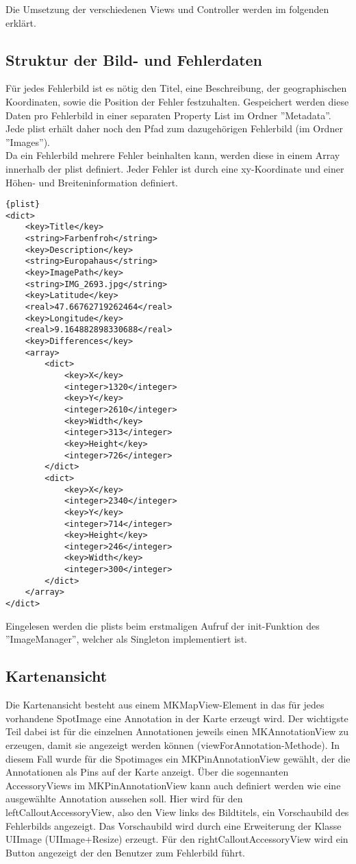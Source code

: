 Die Umsetzung der verschiedenen Views und Controller werden im folgenden erklärt.

\subsection{Struktur der Bild- und Fehlerdaten}
Für jedes Fehlerbild ist es nötig den Titel, eine Beschreibung, der geographischen Koordinaten, sowie die Position der Fehler festzuhalten. Gespeichert werden diese
Daten pro Fehlerbild in einer separaten Property List im Ordner ''Metadata''. Jede plist erhält daher noch den Pfad zum dazugehörigen Fehlerbild (im Ordner ''Images'').\\
Da ein Fehlerbild mehrere Fehler beinhalten kann, werden diese in einem Array innerhalb
der plist definiert. Jeder Fehler ist durch eine xy-Koordinate und einer Höhen- und Breiteninformation definiert.

\begin{lstlisting}[caption=Ausschnitt aus einer plist]{plist}
<dict>
	<key>Title</key>
	<string>Farbenfroh</string>
	<key>Description</key>
	<string>Europahaus</string>
	<key>ImagePath</key>
	<string>IMG_2693.jpg</string>
	<key>Latitude</key>
	<real>47.66762719262464</real>
	<key>Longitude</key>
	<real>9.164882898330688</real>
	<key>Differences</key>
	<array>
		<dict>
			<key>X</key>
			<integer>1320</integer>
			<key>Y</key>
			<integer>2610</integer>
			<key>Width</key>
			<integer>313</integer>
			<key>Height</key>
			<integer>726</integer>
		</dict>
		<dict>
			<key>X</key>
			<integer>2340</integer>
			<key>Y</key>
			<integer>714</integer>
			<key>Height</key>
			<integer>246</integer>
			<key>Width</key>
			<integer>300</integer>
		</dict>
	</array>
</dict>
\end{lstlisting}

Eingelesen werden die plists beim erstmaligen Aufruf der init-Funktion des ''ImageManager'', welcher als Singleton implementiert ist. 

\subsection{Kartenansicht}
Die Kartenansicht besteht aus einem MKMapView-Element in das für jedes
vorhandene SpotImage eine Annotation in der Karte erzeugt wird. Der wichtigste
Teil dabei ist für die einzelnen Annotationen jeweils einen MKAnnotationView zu
erzeugen, damit sie angezeigt werden können (viewForAnnotation-Methode). In
diesem Fall wurde für die Spotimages ein MKPinAnnotationView gewählt, der die Annotationen als Pins auf
der Karte anzeigt. Über die sogennanten AccessoryViews im MKPinAnnotationView
kann auch definiert werden wie eine ausgewählte Annotation aussehen soll. Hier
wird für den leftCalloutAccessoryView, also den View links des Bildtitels, ein
Vorschaubild des Fehlerbilds angezeigt. Das Vorschaubild wird durch eine
Erweiterung der Klasse UIImage (UIImage+Resize) erzeugt. Für den
rightCalloutAccessoryView wird ein Button angezeigt der den Benutzer zum
Fehlerbild führt. 
